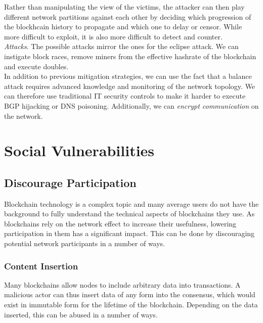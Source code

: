 \documentclass[12pt,a4paper]{article}
\begin{document}
Rather than manipulating the view of the victims, the attacker can then play different network partitions against each other by deciding which progression of the blockhcain history to propagate and which one to delay or censor. While more difficult to exploit, it is also more difficult to detect and counter.\\

\textit{Attacks}. The possible attacks mirror the ones for the eclipse attack. We can instigate block races, remove \glspl{miner} from the effective \gls{hashrate} of the \gls{blockchain} and execute \glspl{double}.\\

In addition to previous mitigation strategies, we can use the fact that a balance attack requires advanced knowledge and monitoring of the network topology. We can therefore use traditional IT security controls to make it harder to execute BGP hijacking or DNS poisoning. Additionally, we can \textit{encrypt communication} on the network.\\

\section{Social Vulnerabilities}

\subsection{Discourage Participation}

Blockchain technology is a complex topic and many average users do not have the background to fully understand the technical aspects of \glspl{blockchain} they use. As \glspl{blockchain} rely on the \gls{network effect} to increase their usefulness, lowering participation in them has a significant impact. This can be done by discouraging potential network participants in a number of ways.\\

\subsubsection{Content Insertion}

Many \glspl{blockchain} allow \glspl{node} to include arbitrary data into \glspl{transaction}. A malicious actor can thus insert data of any form into the \gls{consensus}, which would exist in immutable form for the lifetime of the \gls{blockchain}. Depending on the data inserted, this can be abused in a number of ways.\\
\end{document}
